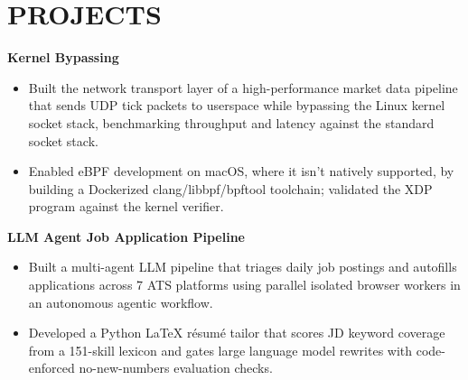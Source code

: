 \documentclass[10pt,letterpaper]{article}
\begin{document}
\section*{PROJECTS}
\textbf{Kernel Bypassing}\par\vspace{2pt}
\begin{itemize}
  \item Built the network transport layer of a high-performance market data pipeline that sends UDP tick packets to userspace while bypassing the Linux kernel socket stack, benchmarking throughput and latency against the standard socket stack.
  \item Enabled eBPF development on macOS, where it isn't natively supported, by building a Dockerized clang/libbpf/bpftool toolchain; validated the XDP program against the kernel verifier.
\end{itemize}
\vspace{2pt}
\textbf{LLM Agent Job Application Pipeline}\par\vspace{2pt}
\begin{itemize}
  \item Built a multi-agent LLM pipeline that triages daily job postings and autofills applications across 7 ATS platforms using parallel isolated browser workers in an autonomous agentic workflow.
  \item Developed a Python LaTeX résumé tailor that scores JD keyword coverage from a 151-skill lexicon and gates large language model rewrites with code-enforced no-new-numbers evaluation checks.
\end{itemize}


\end{document}
